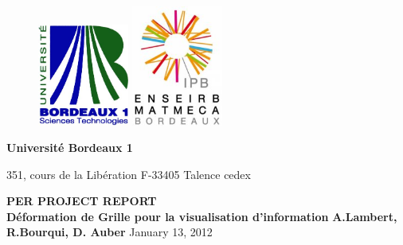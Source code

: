 \begin{titlepage}
  \begin {figure}[ht]
	\includegraphics[angle=0,width=3cm]{img/logobordeaux1.jpg}
        \hspace{11cm}
	\includegraphics[angle=0,width=3cm]{img/logo.jpg}
	\label{logo}
  \end {figure}
  \begin{flushleft}
    \textbf{Université Bordeaux 1}

    351, cours de la Libération 
    F-33405 Talence cedex 
    
  \end{flushleft}
  
  \vspace{4cm}
	\begin{center}
	  {\bf PER PROJECT REPORT}\\
	  \vspace{1cm}
		  {\LARGE\bf Déformation de Grille pour la visualisation d'information}
	   \vspace{4cm}
		   {\small\bf A.Lambert, R.Bourqui, D. Auber}	  
\vspace{4cm}
           January 13, 2012

	\end{center}



\end{titlepage}
